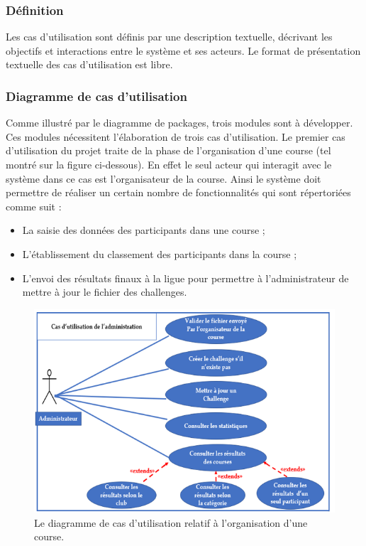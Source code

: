 \subsubsection{Définition}
Les cas d'utilisation sont définis par une description textuelle, décrivant les objectifs et interactions entre le système et ses acteurs. Le format de présentation textuelle des cas d'utilisation est libre.
\subsubsection{Diagramme de cas d’utilisation }
Comme illustré par le diagramme de packages, trois modules sont à développer. Ces modules nécessitent l’élaboration de trois cas d’utilisation. Le premier cas d’utilisation du projet traite de la phase de l’organisation d’une course (tel montré sur la figure ci-dessous). En effet le seul acteur qui interagit avec le système dans ce cas est l’organisateur de la course. Ainsi le système doit permettre de réaliser un certain nombre de fonctionnalités qui sont répertoriées comme suit :
\begin{itemize} 
\item La saisie des données des participants dans une course ;
\item  L’établissement du classement des participants dans la course ;
\item  L’envoi des résultats finaux à la ligue pour permettre à l’administrateur de mettre à jour le fichier des challenges.
\end{itemize} 

\begin{figure}[!h]
	   \center
	   \includegraphics[scale=0.9]{img/Diagramme_cas_utilisation_organisation_course.png}
	   \caption {Le diagramme de cas d’utilisation relatif à l’organisation d’une course.}
\end{figure}


